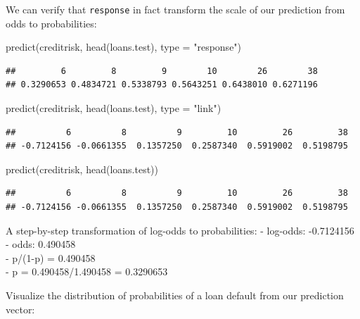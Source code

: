 \documentclass[
]{article}
\newenvironment{Shaded}{\begin{snugshade}}{\end{snugshade}}
\newcommand{\AttributeTok}[1]{\textcolor[rgb]{0.77,0.63,0.00}{#1}}
\newcommand{\FunctionTok}[1]{\textcolor[rgb]{0.00,0.00,0.00}{#1}}
\newcommand{\NormalTok}[1]{#1}
\newcommand{\StringTok}[1]{\textcolor[rgb]{0.31,0.60,0.02}{#1}}
\begin{document}
We can verify that \texttt{response} in fact transform the scale of our
prediction from odds to probabilities:

\begin{Shaded}
\begin{Highlighting}[]
\FunctionTok{predict}\NormalTok{(creditrisk, }\FunctionTok{head}\NormalTok{(loans.test), }\AttributeTok{type =} \StringTok{"response"}\NormalTok{)}
\end{Highlighting}
\end{Shaded}

\begin{verbatim}
##         6         8         9        10        26        38 
## 0.3290653 0.4834721 0.5338793 0.5643251 0.6438010 0.6271196
\end{verbatim}

\begin{Shaded}
\begin{Highlighting}[]
\FunctionTok{predict}\NormalTok{(creditrisk, }\FunctionTok{head}\NormalTok{(loans.test), }\AttributeTok{type =} \StringTok{"link"}\NormalTok{)}
\end{Highlighting}
\end{Shaded}

\begin{verbatim}
##          6          8          9         10         26         38 
## -0.7124156 -0.0661355  0.1357250  0.2587340  0.5919002  0.5198795
\end{verbatim}

\begin{Shaded}
\begin{Highlighting}[]
\FunctionTok{predict}\NormalTok{(creditrisk, }\FunctionTok{head}\NormalTok{(loans.test))}
\end{Highlighting}
\end{Shaded}

\begin{verbatim}
##          6          8          9         10         26         38 
## -0.7124156 -0.0661355  0.1357250  0.2587340  0.5919002  0.5198795
\end{verbatim}

A step-by-step transformation of log-odds to probabilities: - log-odds:
-0.7124156\\
- odds: 0.490458\\
- p/(1-p) = 0.490458\\
- p = 0.490458/1.490458 = 0.3290653

Visualize the distribution of probabilities of a loan default from our
prediction vector:
\end{document}
